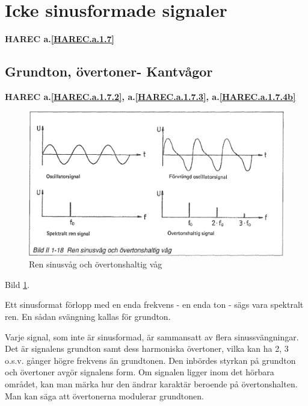 \section{Icke sinusformade signaler}
\textbf{HAREC a.\ref{HAREC.a.1.7}\label{myHAREC.a.1.7}}

\subsection{Grundton, övertoner- Kantvågor}
\textbf{HAREC a.\ref{HAREC.a.1.7.2}, a.\ref{HAREC.a.1.7.3}, a.\ref{HAREC.a.1.7.4b}\label{myHAREC.a.1.7.2}\label{myHAREC.a.1.7.3}\label{myHAREC.a.1.7.4b}}

\begin{figure}
\begin{center}
\includegraphics[width=\textwidth]{images/bild_2_1-18}
\caption{Ren sinusvåg och övertonshaltig våg}
\label{fig:BildII1-18}
\end{center}
\end{figure}

Bild \ref{fig:BildII1-18}.

Ett sinusformat förlopp med en enda frekvens - en enda ton - sägs vara
spektralt ren. En sådan svängning kallas för grundton.

Varje signal, som inte är sinusformad, är sammansatt av flera sinussvängningar.
Det är signalens grundton samt dess harmoniska övertoner, vilka kan ha 2, 3
o.s.v. gånger högre frekvens än grundtonen. Den inbördes styrkan på grundton
och övertoner avgör signalens form. Om signalen ligger inom det hörbara
området, kan man märka hur den ändrar karaktär beroende på övertonshalten. Man
kan säga att övertonerna modulerar grundtonen.

